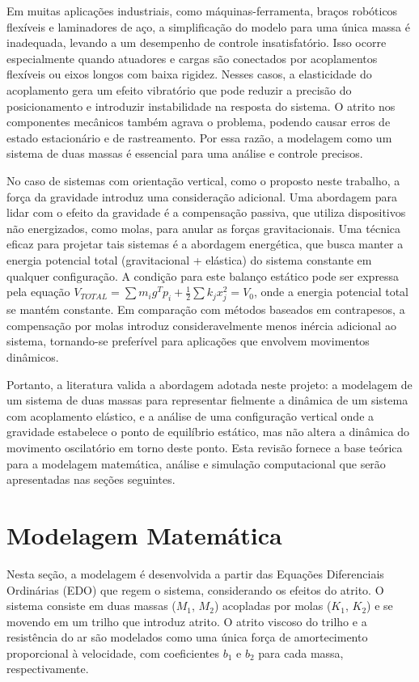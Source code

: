 \documentclass[9pt,a4paper,twocolumn,twoside]{tau-class/tau}
\begin{document}
Em muitas aplicações industriais, como máquinas-ferramenta, braços robóticos flexíveis e laminadores de aço, a simplificação do modelo para uma única massa é inadequada, levando a um desempenho de controle insatisfatório. Isso ocorre especialmente quando atuadores e cargas são conectados por acoplamentos flexíveis ou eixos longos com baixa rigidez. Nesses casos, a elasticidade do acoplamento gera um efeito vibratório que pode reduzir a precisão do posicionamento e introduzir instabilidade na resposta do sistema. O atrito nos componentes mecânicos também agrava o problema, podendo causar erros de estado estacionário e de rastreamento. Por essa razão, a modelagem como um sistema de duas massas é essencial para uma análise e controle precisos. \cite{ComparativeStudy}

No caso de sistemas com orientação vertical, como o proposto neste trabalho, a força da gravidade introduz uma consideração adicional. Uma abordagem para lidar com o efeito da gravidade é a compensação passiva, que utiliza dispositivos não energizados, como molas, para anular as forças gravitacionais. Uma técnica eficaz para projetar tais sistemas é a abordagem energética, que busca manter a energia potencial total (gravitacional + elástica) do sistema constante em qualquer configuração. A condição para este balanço estático pode ser expressa pela equação $V_{TOTAL} = \sum m_i g^T p_i + \frac{1}{2} \sum k_j x^2_j = V_0$, onde a energia potencial total se mantém constante. Em comparação com métodos baseados em contrapesos, a compensação por molas introduz consideravelmente menos inércia adicional ao sistema, tornando-se preferível para aplicações que envolvem movimentos dinâmicos. \cite{PassiveGravity}

Portanto, a literatura valida a abordagem adotada neste projeto: a modelagem de um sistema de duas massas para representar fielmente a dinâmica de um sistema com acoplamento elástico, e a análise de uma configuração vertical onde a gravidade estabelece o ponto de equilíbrio estático, mas não altera a dinâmica do movimento oscilatório em torno deste ponto. Esta revisão fornece a base teórica para a modelagem matemática, análise e simulação computacional que serão apresentadas nas seções seguintes.

\section{Modelagem Matemática}

Nesta seção, a modelagem é desenvolvida a partir das Equações Diferenciais Ordinárias (EDO) que regem o sistema, considerando os efeitos do atrito. O sistema consiste em duas massas ($M_1$, $M_2$) acopladas por molas ($K_1$, $K_2$) e se movendo em um trilho que introduz atrito. O atrito viscoso do trilho e a resistência do ar são modelados como uma única força de amortecimento proporcional à velocidade, com coeficientes $b_1$ e $b_2$ para cada massa, respectivamente.
\end{document}
